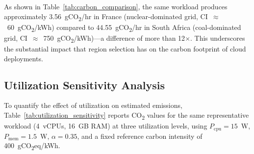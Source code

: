 \documentclass[conference]{IEEEtran}
\begin{document}
\begin{table}[htbp]
\centering
\caption{CO\textsubscript{2} emissions (g/hr) for 4 vCPU, 16 GB RAM at 50\% utilization across selected regions.}
\label{tab:carbon_comparison}
\small
{}
\end{table}

As shown in Table~\ref{tab:carbon_comparison}, the same workload produces approximately 3.56~gCO\textsubscript{2}/hr in France (nuclear-dominated grid, CI~$\approx$~60~gCO\textsubscript{2}/kWh) compared to 44.55~gCO\textsubscript{2}/hr in South Africa (coal-dominated grid, CI~$\approx$~750~gCO\textsubscript{2}/kWh)---a difference of more than 12$\times$. This underscores the substantial impact that region selection has on the carbon footprint of cloud deployments.

\subsection{Utilization Sensitivity Analysis}

To quantify the effect of utilization on estimated emissions, Table~\ref{tab:utilization_sensitivity} reports CO\textsubscript{2} values for the same representative workload (4~vCPUs, 16~GB RAM) at three utilization levels, using $P_{\text{cpu}}=15$~W, $P_{\text{mem}}=1.5$~W, $\alpha=0.35$, and a fixed reference carbon intensity of 400~gCO\textsubscript{2}eq/kWh.
\end{document}
